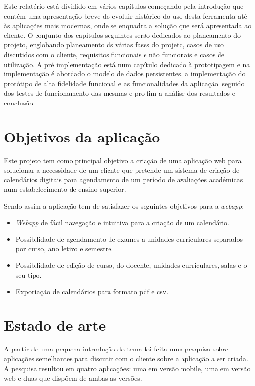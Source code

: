 \documentclass[11pt, twoside]{report}
\begin{document}
	Este relatório está dividido em vários capítulos começando pela introdução que contém uma apresentação breve do evoluir histórico do uso desta ferramenta até às aplicações mais modernas, onde se enquadra a solução que será apresentada ao cliente.
	O conjunto dos capítulos seguintes serão dedicados ao planeamento do projeto, englobando planeamento ds várias fases do projeto, casos de uso discutidos com o cliente, requisitos funcionais e não funcionais e casos de utilização.
	A pré implementação está num capítulo dedicado à prototipagem e na implementação é abordado o modelo de dados persistentes, a implementação do protótipo de alta fidelidade funcional e as funcionalidades da aplicação, seguido dos testes de funcionamento das mesmas e pro fim a análise dos resultados e conclusão .
	
	\section{Objetivos da aplicação}
	
	Este projeto tem como principal objetivo a criação de uma aplicação web para solucionar a necessidade de um cliente que pretende um sistema de criação de calendários digitais para agendamento de um período de avaliações académicas num estabelecimento de ensino superior. 
	
	Sendo assim a aplicação tem de satisfazer os seguintes objetivos para a \textit{webapp}: 
	\begin{itemize} 
		\item \textit{Webapp} de fácil navegação e intuitiva para a criação de um calendário. 
		\item Possibilidade de agendamento de exames a unidades curriculares separados por curso, ano letivo e semestre.   
		\item Possibilidade de edição de curso, do docente, unidades curriculares, salas e o seu tipo. 
		\item Exportação de calendários para formato pdf e csv. 
	\end{itemize} 
	\section{Estado de arte}
	\label{estadodearte}
	
	A partir de uma pequena introdução do tema foi feita uma pesquisa sobre aplicações semelhantes para discutir com o cliente sobre a aplicação a ser criada. A pesquisa resultou em quatro aplicações: uma em versão mobile, uma em versão web e duas que dispõem de ambas as versões.
	
\end{document}

